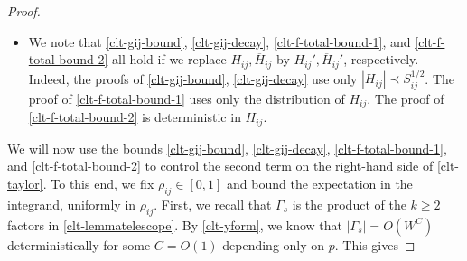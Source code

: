 \begin{proof}
\begin{itemize}
and recall that $Y_{s,b_{1}}$ has the form \eqref{clt-yform}. In particular, $\partial_{1}f_{s,b_{1}}$ is the derivative of $Y_{s,b_{1}}$ from \eqref{clt-yform} with respect to $H_{ij}$ (treating $H_{ij}$ and $\overline{H}_{ij}$ as separate variables), and $\partial_{2}f_{s,b_{1}}$ is the derivative of $Y_{s,b_{1}}$ in $\overline{H}_{ij}$. Each such derivative can only act on entries of $G_{s}$ or $G_{s}^{\dagger}$ in \eqref{clt-yform}; when it hits one such entry, it returns two entries of $G_{s}$ or $G_{s}^{\dagger}$. More precisely, we have $\partial_{H_{ij}}(G_{s})_{xy}=-(G_{s})_{xi}(G_{s})_{jy}$, and similar standard formulas hold for $\overline{H}_{ij}$ instead of $H_{ij}$ and/or $G_{s}^{\dagger}$ instead of $G_{s}$. Therefore, since $\|C\|_{\max}\leq N^{C'}$ in \eqref{clt-yform}, and since $W\geq N^{\mathfrak{c}}$ gives $\|C\|_{\max}=O(W^{C})$ for some $C=O(1)$, we deduce from \eqref{clt-gij-bound} that for any $\alpha=O(1)$ and $0\leq v\leq \alpha$ and $\gamma_{ij}=O(1)$, we have
%
\begin{align}
|\partial_{1}^{v}\partial_{2}^{\alpha-v}f_{s,b_{1}}(\gamma_{ij} H_{ij},\gamma_{ij}\overline{H}_{ij})|\prec W^{C}.\label{clt-f-total-bound-1}
\end{align}
%
If we instead bound entries of Green's functions that appear in $\partial_{1}^{v}\partial_{2}^{\alpha-v}f_{s,b_{1}}$ using the deterministic bound $O(W^{C})$ for some $C=O(1)$, then we instead have the following deterministic bound for any $\alpha=O(1)$ and $0\leq v\leq \alpha$ and $\gamma_{ij}=O(1)$, where now $C_{D_{1}}$ depends on $D_{1}>0$:
%
\begin{align}
|\partial_{1}^{v}\partial_{2}^{\alpha-v}f_{s,b_{1}}(\gamma_{ij} H_{ij},\gamma_{ij}\overline{H}_{ij})|= O(W^{C_{D_{1}}}).\label{clt-f-total-bound-2}
\end{align}
%
\item We note that \eqref{clt-gij-bound}, \eqref{clt-gij-decay}, \eqref{clt-f-total-bound-1}, and \eqref{clt-f-total-bound-2} all hold if we replace $H_{ij},\overline{H}_{ij}$ by $H_{ij}',\overline{H}_{ij}'$, respectively. Indeed, the proofs of \eqref{clt-gij-bound}, \eqref{clt-gij-decay} use only $|H_{ij}|\prec S_{ij}^{1/2}$. The proof of \eqref{clt-f-total-bound-1} uses only the distribution of $H_{ij}$. The proof of \eqref{clt-f-total-bound-2} is deterministic in $H_{ij}$.
\end{itemize}
We will now use the bounds \eqref{clt-gij-bound}, \eqref{clt-gij-decay}, \eqref{clt-f-total-bound-1}, and \eqref{clt-f-total-bound-2} to control the second term on the right-hand side of \eqref{clt-taylor}. To this end, we fix $\rho_{ij}\in[0,1]$ and bound the expectation in the integrand, uniformly in $\rho_{ij}$. First, we recall that $\Gamma_{s}$ is the product of the $k\geq2$ factors in \eqref{clt-lemmatelescope}. By \eqref{clt-yform}, we know that $|\Gamma_{s}|=O(W^{C})$ deterministically for some $C=O(1)$ depending only on $p$. This gives

\end{proof}
